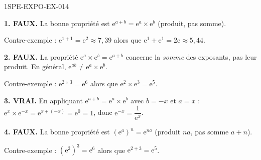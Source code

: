 \begin{corrige}{1SPE-EXPO-EX-014}

\textbf{1. FAUX.} La bonne propriété est $\mathrm{e}^{a+b} = \mathrm{e}^a \times \mathrm{e}^b$ (produit, pas somme).

Contre-exemple : $\mathrm{e}^{1+1} = \mathrm{e}^2 \approx 7{,}39$ alors que $\mathrm{e}^1 + \mathrm{e}^1 = 2\mathrm{e} \approx 5{,}44$.

\textbf{2. FAUX.} La propriété $\mathrm{e}^a \times \mathrm{e}^b = \mathrm{e}^{a+b}$ concerne la \emph{somme} des exposants, pas leur produit. En général, $\mathrm{e}^{ab}
\neq \mathrm{e}^a \times \mathrm{e}^b$.

Contre-exemple : $\mathrm{e}^{2 \times 3} = \mathrm{e}^6$ alors que $\mathrm{e}^2 \times \mathrm{e}^3 = \mathrm{e}^5$.

\textbf{3. VRAI.} En appliquant $\mathrm{e}^{a+b} = \mathrm{e}^a \times \mathrm{e}^b$ avec $b = -x$ et $a = x$ :
$\mathrm{e}^x \times \mathrm{e}^{-x} = \mathrm{e}^{x+(-x)} = \mathrm{e}^0 = 1$, donc $\mathrm{e}^{-x} = \dfrac{1}{\mathrm{e}^x}$.

\textbf{4. FAUX.} La bonne propriété est $\left(\mathrm{e}^a\right)^n = \mathrm{e}^{na}$ (produit $na$, pas somme $a+n$).

Contre-exemple : $\left(\mathrm{e}^2\right)^3 = \mathrm{e}^6$ alors que $\mathrm{e}^{2+3} = \mathrm{e}^5$.
\end{corrige}
